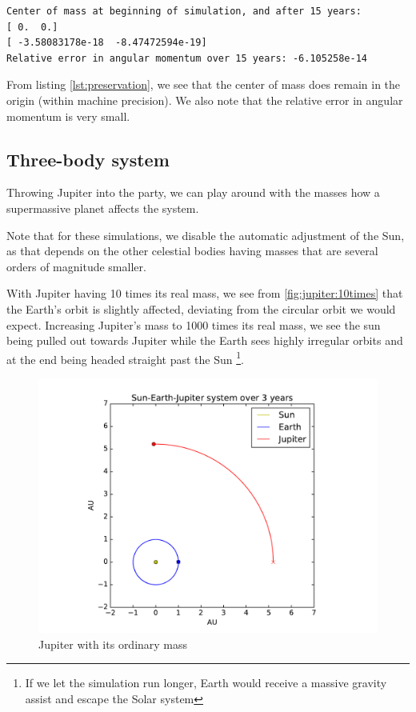 \documentclass[a4paper]{article}
\begin{document}
\begin{lstlisting}[basicstyle=\footnotesize, frame=single, label={lst:preservation},caption=Preservation of center of mass and angular momentum]
Center of mass at beginning of simulation, and after 15 years:
[ 0.  0.]
[ -3.58083178e-18  -8.47472594e-19]
Relative error in angular momentum over 15 years: -6.105258e-14
\end{lstlisting}

From listing \vref{lst:preservation}, we see that the center of mass does remain in the origin (within machine precision). We also note that the relative error in angular momentum is very small.

\subsection{Three-body system}
Throwing Jupiter into the party, we can play around with the masses how a supermassive planet affects the system.

Note that for these simulations, we disable the automatic adjustment of the Sun, as that depends on the other celestial bodies having masses that are several orders of magnitude smaller.

With Jupiter having 10 times its real mass, we see from \vref{fig:jupiter:10times} that the Earth's orbit is slightly affected, deviating from the circular orbit we would expect. Increasing Jupiter's mass to 1000 times its real mass, we see the sun being pulled out towards Jupiter while the Earth sees highly irregular orbits and at the end being headed straight past the Sun \footnote{If we let the simulation run longer, Earth would receive a massive gravity assist and escape the Solar system}.

\begin{figure}[htb]
\includegraphics[width=\textwidth]{fig/jupitermass_1.pdf}
\caption{Jupiter with its ordinary mass}
\label{fig:jupiter:10times}
\end{figure}
\end{document}
